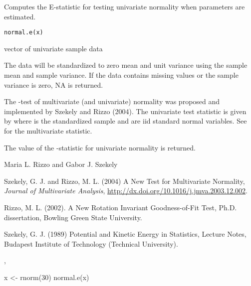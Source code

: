\documentclass{article}
\begin{document}
\begin{Description}\relax
Computes the E-statistic for testing univariate normality 
when parameters are estimated.
\end{Description}
\begin{Usage}
\begin{verbatim}
normal.e(x)
\end{verbatim}
\end{Usage}
\begin{Arguments}
\begin{ldescription}
\item[\code{x}] vector of univariate sample data
\end{ldescription}
\end{Arguments}
\begin{Details}\relax
The
data will be standardized to zero mean and unit variance
using the sample mean and sample variance. If the data contains
missing values or the sample variance is zero, NA is
returned.

The 
-test of multivariate (and univariate)
normality was proposed and implemented by Szekely and Rizzo 
(2004). The univariate test statistic
is given by
where  is the standardized sample and
 are iid standard normal variables. See 
 for the multivariate statistic.\end{Details}
\begin{Value}
The value of the -statistic for univariate
normality is returned.\end{Value}
\begin{Author}\relax
Maria L. Rizzo  and
Gabor J. Szekely 
\end{Author}
\begin{References}\relax
Szekely, G. J. and Rizzo, M. L. (2004) A New Test for 
Multivariate Normality, \emph{Journal of Multivariate Analysis},
\url{http://dx.doi.org/10.1016/j.jmva.2003.12.002}.

Rizzo, M. L. (2002). A New Rotation Invariant Goodness-of-Fit Test,
Ph.D. dissertation, Bowling Green State University.

Szekely, G. J. (1989) Potential and Kinetic Energy in Statistics, 
Lecture Notes, Budapest Institute of Technology (Technical University).\end{References}
\begin{SeeAlso}\relax
{}, 
\end{SeeAlso}
\begin{Examples}
\begin{ExampleCode}
 x <- rnorm(30)
 normal.e(x)
\end{ExampleCode}
\end{Examples}
\end{document}
